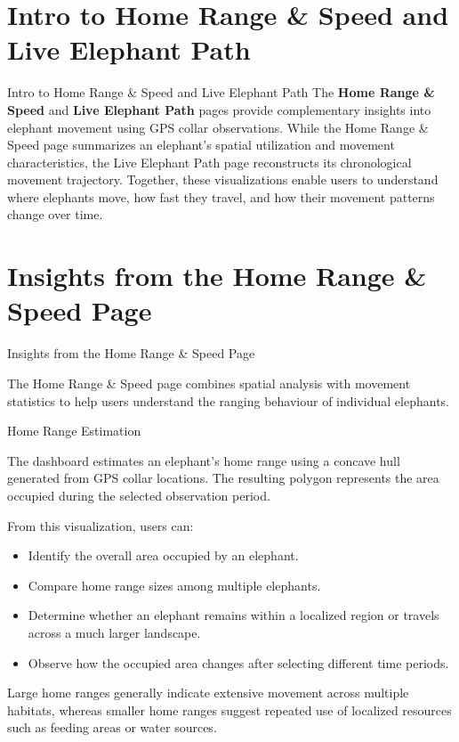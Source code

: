 \documentclass{beamer}
\begin{document}
	
	
	
	
	\section{Intro to Home Range \& Speed and Live Elephant Path}
	\begin{frame}{Intro to Home Range \& Speed and Live Elephant Path}
	The \textbf{Home Range \& Speed} and \textbf{Live Elephant Path} pages provide complementary insights into elephant movement using GPS collar observations. While the Home Range \& Speed page summarizes an elephant's spatial utilization and movement characteristics, the Live Elephant Path page reconstructs its chronological movement trajectory. Together, these visualizations enable users to understand where elephants move, how fast they travel, and how their movement patterns change over time.
	\end{frame}
	
	
	
	
	\section{Insights from the Home Range \& Speed Page}
	\begin{frame}{Insights from the Home Range \& Speed Page}
		\Large
		
		The Home Range \& Speed page combines spatial analysis with movement statistics to help users understand the ranging behaviour of individual elephants.
	\end{frame}	
	
	
	
	
	
	
		\begin{frame}{Home Range Estimation}
		
		The dashboard estimates an elephant's home range using a concave hull generated from GPS collar locations. The resulting polygon represents the area occupied during the selected observation period.
		
		From this visualization, users can:
		
		\begin{itemize}
			\item Identify the overall area occupied by an elephant.
			\item Compare home range sizes among multiple elephants.
			\item Determine whether an elephant remains within a localized region or travels across a much larger landscape.
			\item Observe how the occupied area changes after selecting different time periods.
		\end{itemize}
		
		Large home ranges generally indicate extensive movement across multiple habitats, whereas smaller home ranges suggest repeated use of localized resources such as feeding areas or water sources.
    \end{frame}	
	
\end{document}
